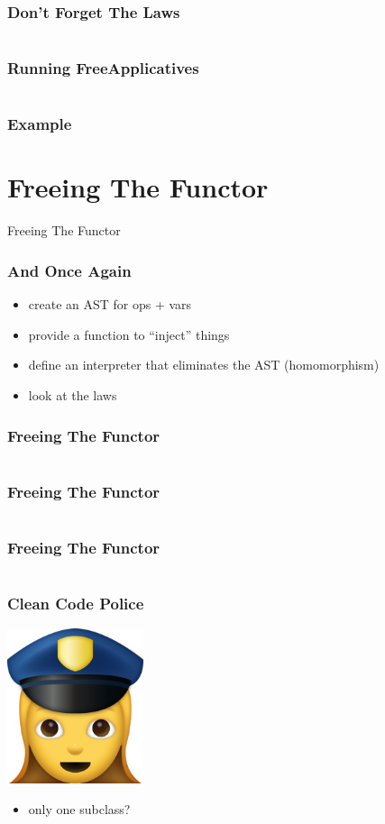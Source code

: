 \documentclass{beamer}
\newcommand{\recipe}{%
  \begin{itemize}
  \item create an AST for ops + vars
  \item provide a function to ``inject'' things
  \item define an interpreter that eliminates the AST (homomorphism)
  \item look at the laws
  \end{itemize}
}
\begin{document}
\begin{frame}
  \frametitle{Don't Forget The Laws}
  \inputminted{scala}{snippets/opt-free-ap-instance.scala}
\end{frame}

\begin{frame}
  \frametitle{Running FreeApplicatives}
  \inputminted{scala}{snippets/freeap-interp.scala}
\end{frame}

\begin{frame}
  \frametitle{Example}
\end{frame}

\section{Freeing The Functor}\label{sec:free-functor}
\begin{frame}
  \begin{center}
    \Huge
    Freeing The Functor
  \end{center}
\end{frame}

\begin{frame}[fragile]
  \frametitle{And Once Again}
  \recipe{}
\end{frame}

\begin{frame}[fragile]
  \frametitle{Freeing The Functor}
  \inputminted{scala}{snippets/functor-typeclass.scala}
\end{frame}

\begin{frame}[fragile]
  \frametitle{Freeing The Functor}
  \inputminted{scala}{snippets/free-functor1.scala}
\end{frame}

\begin{frame}[fragile]
  \frametitle{Freeing The Functor}
  \inputminted{scala}{snippets/free-functor2.scala}
\end{frame}

\begin{frame}[fragile]
  \frametitle{Clean Code Police}
  \begin{center}
    \includegraphics[width=0.3\textwidth]{static-images/police.png}
  \end{center}
  \begin{itemize}
  \item only one subclass?
  \end{itemize}
\end{frame}
\end{document}
